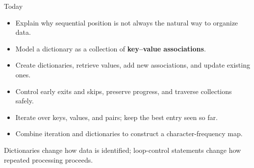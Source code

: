 \documentclass[aspectratio=169,10pt]{beamer}
\begin{document}
\makedecktitle

\begin{frame}{Today}
  \begin{itemize}
    \item Explain why sequential position is not always the natural way to organize data.
    \item Model a dictionary as a collection of \textbf{key--value associations}.
    \item Create dictionaries, retrieve values, add new associations, and update existing ones.
    \item Control early exits and skips, preserve progress, and traverse collections safely.
    \item Iterate over keys, values, and pairs; keep the best entry seen so far.
    \item Combine iteration and dictionaries to construct a character-frequency map.
  \end{itemize}

  \begin{keyidea}
    Dictionaries change how data is identified; loop-control statements change how repeated processing proceeds.
  \end{keyidea}
\end{frame}
\end{document}
